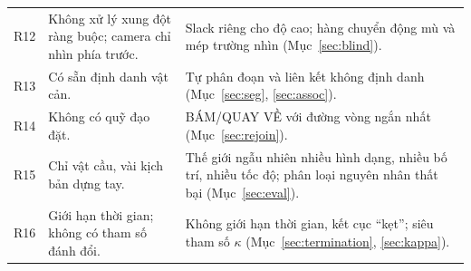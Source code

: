 \documentclass[11pt,a4paper]{article}
\numberwithin{equation}{section}
\theoremstyle{definition}
\theoremstyle{plain}
\theoremstyle{remark}
\begin{document}
{\begin{longtable}{@{}p{0.6cm}p{5.2cm}p{9.2cm}@{}}
R12 & Không xử lý xung đột ràng buộc; camera chỉ nhìn phía trước. & Slack riêng cho độ cao; hàng chuyển động mù và mép trường nhìn (Mục~\ref{sec:blind}). \\
R13 & Có sẵn định danh vật cản. & Tự phân đoạn và liên kết không định danh (Mục~\ref{sec:seg}, \ref{sec:assoc}). \\
R14 & Không có quỹ đạo đặt. & BÁM/QUAY VỀ với đường vòng ngắn nhất (Mục~\ref{sec:rejoin}). \\
R15 & Chỉ vật cầu, vài kịch bản dựng tay. & Thế giới ngẫu nhiên nhiều hình dạng, nhiều bố trí, nhiều tốc độ; phân loại nguyên nhân thất bại (Mục~\ref{sec:eval}). \\
R16 & Giới hạn thời gian; không có tham số đánh đổi. & Không giới hạn thời gian, kết cục ``kẹt''; siêu tham số $\kappa$ (Mục~\ref{sec:termination}, \ref{sec:kappa}). \\
\bottomrule
\end{longtable}
}
\end{document}

